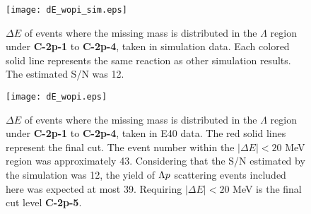 \begin{figure}[!h]
  \begin{center}
    \texttt{[image: dE\_wopi\_sim.eps]}
    \caption{$\Delta E$ of events where the missing mass is distributed in the $\Lambda$ region under {\bf C-2p-1} to {\bf C-2p-4}, taken in simulation data. Each colored solid line represents the same reaction as other simulation results. The estimated S/N was 12.}
    \label{fig-dE_wopi_sim}
  \end{center}
\end{figure}

\begin{figure}[!h]
  \begin{center}
    \texttt{[image: dE\_wopi.eps]}
    \caption{$\Delta E$ of events where the missing mass is distributed in the $\Lambda$ region under {\bf C-2p-1} to {\bf C-2p-4}, taken in E40 data. The red solid lines represent the final cut. The event number within the $|\Delta E|<20$ MeV region was approximately 43. Considering that the S/N estimated by the simulation was 12, the yield of $\Lambda p$ scattering events included here was expected at most 39. Requiring $|\Delta E|<20$ MeV is the final cut level {\bf C-2p-5}.}
    \label{fig-dE_wopi}
  \end{center}
\end{figure}




